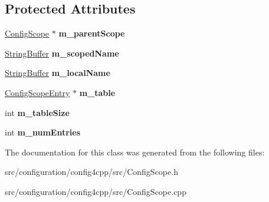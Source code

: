 \subsection*{Protected Attributes}
\begin{DoxyCompactItemize}
\item 
\hypertarget{classCONFIG4CPP__NAMESPACE_1_1ConfigScope_a1afac7d7b7b9d69df84b64540ba4e6ff}{\hyperlink{classCONFIG4CPP__NAMESPACE_1_1ConfigScope}{Config\-Scope} $\ast$ {\bfseries m\-\_\-parent\-Scope}}\label{classCONFIG4CPP__NAMESPACE_1_1ConfigScope_a1afac7d7b7b9d69df84b64540ba4e6ff}

\item 
\hypertarget{classCONFIG4CPP__NAMESPACE_1_1ConfigScope_a9208797fe48b6c42b1dffcb16532b1bb}{\hyperlink{classCONFIG4CPP__NAMESPACE_1_1StringBuffer}{String\-Buffer} {\bfseries m\-\_\-scoped\-Name}}\label{classCONFIG4CPP__NAMESPACE_1_1ConfigScope_a9208797fe48b6c42b1dffcb16532b1bb}

\item 
\hypertarget{classCONFIG4CPP__NAMESPACE_1_1ConfigScope_a1ea2061a66dcaa846f493ddb69cd074c}{\hyperlink{classCONFIG4CPP__NAMESPACE_1_1StringBuffer}{String\-Buffer} {\bfseries m\-\_\-local\-Name}}\label{classCONFIG4CPP__NAMESPACE_1_1ConfigScope_a1ea2061a66dcaa846f493ddb69cd074c}

\item 
\hypertarget{classCONFIG4CPP__NAMESPACE_1_1ConfigScope_a6d57c62c3b41899f904973c9d4d10fe7}{\hyperlink{classCONFIG4CPP__NAMESPACE_1_1ConfigScopeEntry}{Config\-Scope\-Entry} $\ast$ {\bfseries m\-\_\-table}}\label{classCONFIG4CPP__NAMESPACE_1_1ConfigScope_a6d57c62c3b41899f904973c9d4d10fe7}

\item 
\hypertarget{classCONFIG4CPP__NAMESPACE_1_1ConfigScope_a7e37ddcd5996730d3f2bd594121409d4}{int {\bfseries m\-\_\-table\-Size}}\label{classCONFIG4CPP__NAMESPACE_1_1ConfigScope_a7e37ddcd5996730d3f2bd594121409d4}

\item 
\hypertarget{classCONFIG4CPP__NAMESPACE_1_1ConfigScope_aacd0050ed02f443083a7658fff3776fe}{int {\bfseries m\-\_\-num\-Entries}}\label{classCONFIG4CPP__NAMESPACE_1_1ConfigScope_aacd0050ed02f443083a7658fff3776fe}

\end{DoxyCompactItemize}


The documentation for this class was generated from the following files\-:\begin{DoxyCompactItemize}
\item 
src/configuration/config4cpp/src/Config\-Scope.\-h\item 
src/configuration/config4cpp/src/Config\-Scope.\-cpp\end{DoxyCompactItemize}
